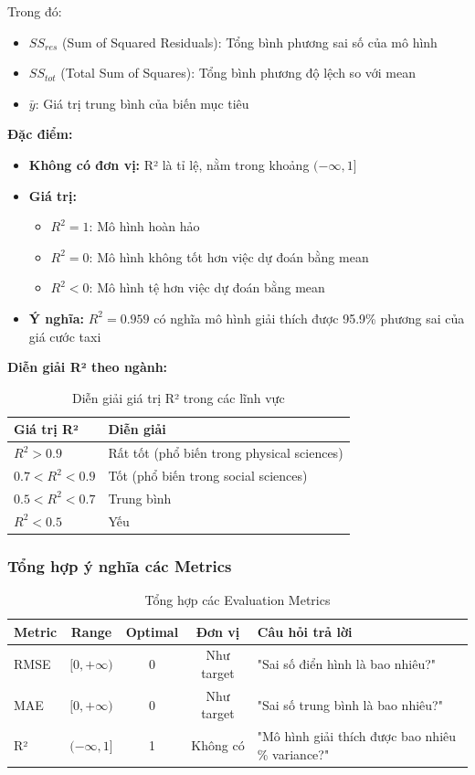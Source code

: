 \documentclass[12pt,a4paper]{article}
\begin{document}
Trong đó:
\begin{itemize}
    \item $SS_{res}$ (Sum of Squared Residuals): Tổng bình phương sai số của mô hình
    \item $SS_{tot}$ (Total Sum of Squares): Tổng bình phương độ lệch so với mean
    \item $\bar{y}$: Giá trị trung bình của biến mục tiêu
\end{itemize}

\textbf{Đặc điểm:}
\begin{itemize}
    \item \textbf{Không có đơn vị:} R² là tỉ lệ, nằm trong khoảng $(-\infty, 1]$
    \item \textbf{Giá trị:}
    \begin{itemize}
        \item $R^2 = 1$: Mô hình hoàn hảo
        \item $R^2 = 0$: Mô hình không tốt hơn việc dự đoán bằng mean
        \item $R^2 < 0$: Mô hình tệ hơn việc dự đoán bằng mean
    \end{itemize}
    \item \textbf{Ý nghĩa:} $R^2 = 0.959$ có nghĩa mô hình giải thích được 95.9\% phương sai của giá cước taxi
\end{itemize}

\textbf{Diễn giải R² theo ngành:}
\begin{table}[H]
\centering
\caption{Diễn giải giá trị R² trong các lĩnh vực}
\begin{tabular}{|l|l|}
\hline
\textbf{Giá trị R²} & \textbf{Diễn giải} \\
\hline
$R^2 > 0.9$ & Rất tốt (phổ biến trong physical sciences) \\
\hline
$0.7 < R^2 < 0.9$ & Tốt (phổ biến trong social sciences) \\
\hline
$0.5 < R^2 < 0.7$ & Trung bình \\
\hline
$R^2 < 0.5$ & Yếu \\
\hline
\end{tabular}
\end{table}

\subsubsection{Tổng hợp ý nghĩa các Metrics}

\begin{table}[H]
\centering
\caption{Tổng hợp các Evaluation Metrics}
\label{tab:metrics_summary}
\begin{tabular}{|l|c|c|c|p{4cm}|}
\hline
\textbf{Metric} & \textbf{Range} & \textbf{Optimal} & \textbf{Đơn vị} & \textbf{Câu hỏi trả lời} \\
\hline
RMSE & $[0, +\infty)$ & 0 & Như target & "Sai số điển hình là bao nhiêu?" \\
\hline
MAE & $[0, +\infty)$ & 0 & Như target & "Sai số trung bình là bao nhiêu?" \\
\hline
R² & $(-\infty, 1]$ & 1 & Không có & "Mô hình giải thích được bao nhiêu \% variance?" \\
\hline
\end{tabular}
\end{table}
\end{document}
